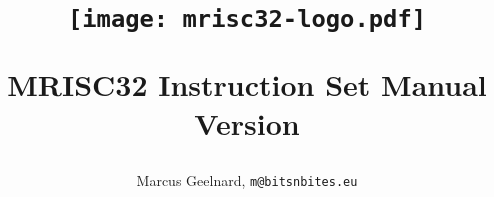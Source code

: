 %

\title{
  \vspace{-0.5in}
  \begin{figure}[h!]
    \texttt{[image: mrisc32-logo.pdf]}
  \end{figure}
  \vspace{1.2in}
  \LARGE \textbf{MRISC32 Instruction Set Manual} \\
  Version \specrev
  \vspace{-0.1in}}

\author{Marcus Geelnard, \texttt{m@bitsnbites.eu}}


{\let\center\flushleft
\let\endcenter\endflushleft
\maketitle}

